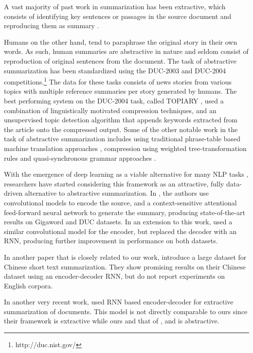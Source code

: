 \documentclass[11pt]{article}
\begin{document}
A vast majority of past work in summarization has been extractive, which consists of identifying key sentences or passages in the source document and reproducing them as summary \cite{neto:2002:ATS,extractive,wong:2008:ESU,filippovaA13:EMNLP,colmenares:NAACL2015,graph_based,key_phrases,key_passages}.


Humans on the other hand, tend to paraphrase the original story in their own words. As such, human summaries are abstractive in nature and seldom consist of reproduction of original sentences from the document. The task of abstractive summarization has been standardized using the DUC-2003 and DUC-2004 competitions.\footnote{http://duc.nist.gov/} The data for these tasks consists of news stories from various topics with multiple reference summaries per story generated by humans. 
The best performing system on the DUC-2004 task, called TOPIARY \cite{topiary}, used a combination of linguistically motivated compression techniques, and an unsupervised topic detection algorithm that appends keywords extracted from the article onto the compressed output. Some of the other notable work in the task of abstractive summarization includes using traditional phrase-table based machine translation approaches \cite{mt4summ}, compression using weighted tree-transformation rules \cite{cohn_lapata} and quasi-synchronous grammar approaches \cite{woodsend}.



With the emergence of deep learning as a viable alternative for many NLP tasks \cite{nlp_from_scratch}, researchers have started considering this framework as an  attractive, fully data-driven alternative to abstractive summarization. 
In , the authors use convolutional models to encode the source, and a context-sensitive attentional feed-forward neural network to generate the summary, producing state-of-the-art results on Gigaword and DUC datasets. In an extension to this work,  used a similar convolutional model for the encoder, but replaced the decoder with an RNN, producing further improvement in performance on both datasets.

In another paper that is closely related to our work,  introduce a large dataset for Chinese short text summarization. They show promising results on their Chinese dataset using an encoder-decoder RNN, but do not report experiments on English corpora. 

In another very recent work,  used RNN based encoder-decoder for extractive summarization of documents. This model is not directly comparable to ours since their framework is extractive while ours and that of \cite{namas}, \cite{hu:2015:EMNLP} and \cite{chopra} is abstractive.
\end{document}
